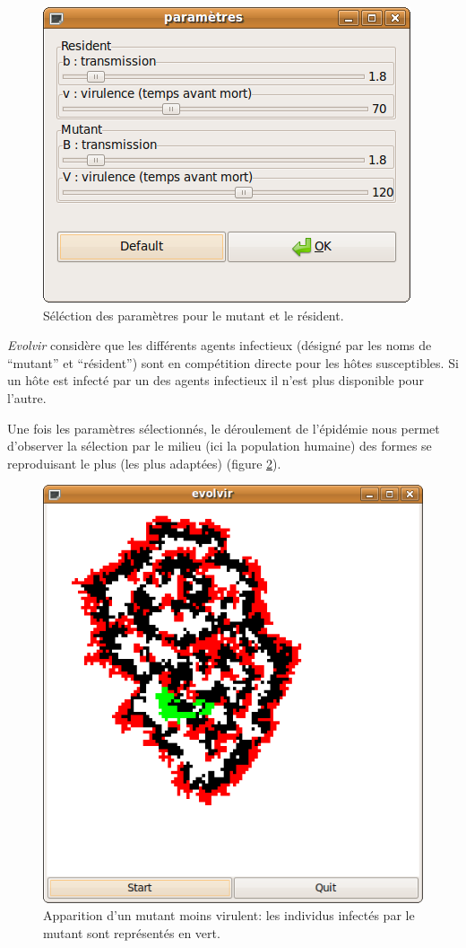 \documentclass[12pt]{article}
\begin{document}
\begin{figure}[h!]
  \center
	\includegraphics[width=0.4\linewidth]{graph/parametres_mutant.png}
        \caption{Séléction des paramètres pour le mutant et le résident.}
\label{fig:parametres_mutant}
\end{figure}

\textit{Evolvir} considère que les différents agents infectieux
(désigné par les noms de ``mutant'' et ``résident'') sont en
compétition directe pour les hôtes susceptibles. Si un hôte est infecté
par un des agents infectieux il n'est plus disponible pour l'autre.

Une fois les paramètres sélectionnés, le déroulement de l'épidémie
nous permet d'observer la sélection par le milieu (ici la population
humaine) des formes se reproduisant le plus (les plus adaptées)
(figure \ref{fig:mutant}). 
\begin{figure}[h!]
  \center
	\includegraphics[width=0.4\linewidth]{graph/mutant.png}
        \caption{Apparition d'un mutant moins virulent: les individus
          infectés par le mutant sont représentés en vert.}
\label{fig:mutant}
\end{figure}
\end{document}
